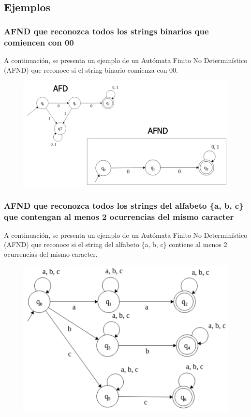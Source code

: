 \documentclass[11pt]{article}
\begin{document}
    \subsection{Ejemplos}

    \subsubsection{AFND que reconozca todos los strings binarios que comiencen con 00}

    A continuación, se presenta un ejemplo de un Autómata Finito No Determinístico (AFND) que reconoce si el string binario comienza con 00.

    \begin{figure}[H]
        \centering
        \includegraphics[width=\textwidth]{img/afnd/afnd-1}\label{fig:figure12}
    \end{figure}

    \subsubsection{AFND que reconozca todos los strings del alfabeto \{a, b, c\} que contengan al menos 2 ocurrencias del mismo caracter}

    A continuación, se presenta un ejemplo de un Autómata Finito No Determinístico (AFND) que reconoce si el string del alfabeto \{a, b, c\} contiene al menos 2 ocurrencias del mismo caracter.

    \begin{figure}[H]
        \centering
        \includegraphics[width=\textwidth]{img/afnd/afnd-2}\label{fig:figure13}
    \end{figure}
\end{document}
